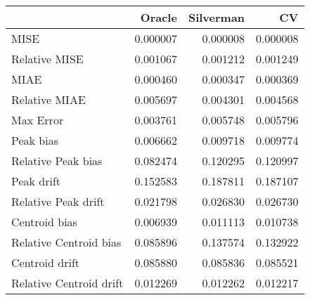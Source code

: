 \begin{tabular}{lrrr}
  \hline
 & Oracle & Silverman & CV \\ 
  \hline
MISE & 0.000007 & 0.000008 & 0.000008 \\ 
  Relative MISE & 0.001067 & 0.001212 & 0.001249 \\ 
  MIAE & 0.000460 & 0.000347 & 0.000369 \\ 
  Relative MIAE & 0.005697 & 0.004301 & 0.004568 \\ 
  Max Error & 0.003761 & 0.005748 & 0.005796 \\ 
  Peak bias & 0.006662 & 0.009718 & 0.009774 \\ 
  Relative Peak bias & 0.082474 & 0.120295 & 0.120997 \\ 
  Peak drift & 0.152583 & 0.187811 & 0.187107 \\ 
  Relative Peak drift & 0.021798 & 0.026830 & 0.026730 \\ 
  Centroid bias & 0.006939 & 0.011113 & 0.010738 \\ 
  Relative Centroid bias & 0.085896 & 0.137574 & 0.132922 \\ 
  Centroid drift & 0.085880 & 0.085836 & 0.085521 \\ 
  Relative Centroid drift & 0.012269 & 0.012262 & 0.012217 \\ 
   \hline
\end{tabular}
